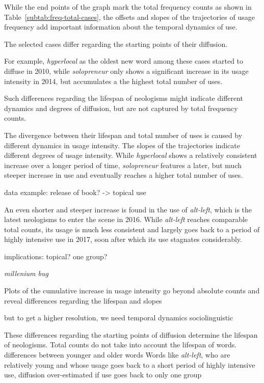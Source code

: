 \documentclass[
  a4paper,
  abstract=on,
  captions=tableabove
  ]{scrartcl}
\begin{document}
  While the end points of the graph mark the total frequency counts as shown in Table~\ref{subtab:freq-total-cases}, the offsets and slopes of the trajectories of usage frequency add important information about the temporal dynamics of use.

  The selected cases differ regarding the starting points of their diffusion.

  For example, \emph{hyperlocal} as the oldest new word among these cases started to diffuse in 2010, while \emph{solopreneur} only shows a significant increase in its usage intensity in 2014, but accumulates a the highest total number of uses.

  Such differences regarding the lifespan of neologisms might indicate different dynamics and degrees of diffusion, but are not captured by total frequency counts.

  The divergence between their lifespan and total number of uses is caused by different dynamics in usage intensity.
  The slopes of the trajectories indicate different degrees of usage intensity.
  While \emph{hyperlocal} shows a relatively consistent increase over a longer period of time, \emph{solopreneur} features a later, but much steeper increase in use and eventually reaches a higher total number of uses.

  data example: release of book? -> topical use

  An even shorter and steeper increase is found in the use of \emph{alt-left}, which is the latest neologisms to enter the scene in 2016. While \emph{alt-left} reaches comparable total counts, its usage is much less consistent and largely goes back to a period of highly intensive use in 2017, soon after which its use stagnates considerably.

  implications: topical? one group?
 
  \emph{millenium bug}


  Plots of the cumulative increase in usage intensity
    go beyond absolute counts
    and reveal differences
      regarding the lifespan
      and slopes

  but to get a higher resolution, we need
    temporal dynamics
    sociolinguistic









  These differences regarding the starting points of diffusion determine the lifespan of neologisms.
  Total counts do not take into account the lifespan of words.
  differences between younger and older words
  Words like \emph{alt-left}, who are relatively young and whose usage goes back to a short period of highly intensive use,
    diffusion over-estimated
      if use goes back to only one group
\end{document}
